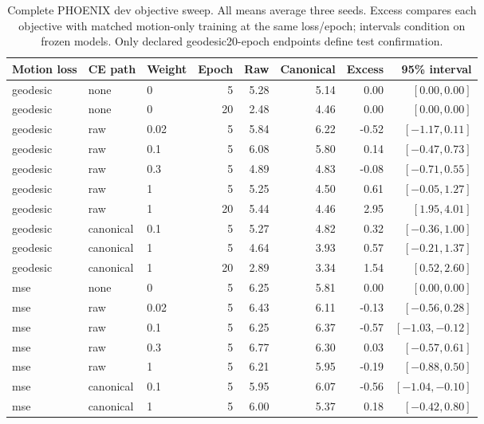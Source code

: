 \begin{table}[t]
\centering\small
\caption{Complete PHOENIX dev objective sweep. All means average three seeds. Excess compares each objective with matched motion-only training at the same loss/epoch; intervals condition on frozen models. Only declared geodesic20-epoch endpoints define test confirmation.}
\label{tab:ordinarysweep}
\begin{tabular}{lllrrrrr}\toprule
Motion loss&CE path&Weight&Epoch&Raw&Canonical&Excess&95\% interval\\\midrule
geodesic&none&0&5&5.28&5.14&0.00&$[0.00,0.00]$\\
geodesic&none&0&20&2.48&4.46&0.00&$[0.00,0.00]$\\
geodesic&raw&0.02&5&5.84&6.22&-0.52&$[-1.17,0.11]$\\
geodesic&raw&0.1&5&6.08&5.80&0.14&$[-0.47,0.73]$\\
geodesic&raw&0.3&5&4.89&4.83&-0.08&$[-0.71,0.55]$\\
geodesic&raw&1&5&5.25&4.50&0.61&$[-0.05,1.27]$\\
geodesic&raw&1&20&5.44&4.46&2.95&$[1.95,4.01]$\\
geodesic&canonical&0.1&5&5.27&4.82&0.32&$[-0.36,1.00]$\\
geodesic&canonical&1&5&4.64&3.93&0.57&$[-0.21,1.37]$\\
geodesic&canonical&1&20&2.89&3.34&1.54&$[0.52,2.60]$\\
mse&none&0&5&6.25&5.81&0.00&$[0.00,0.00]$\\
mse&raw&0.02&5&6.43&6.11&-0.13&$[-0.56,0.28]$\\
mse&raw&0.1&5&6.25&6.37&-0.57&$[-1.03,-0.12]$\\
mse&raw&0.3&5&6.77&6.30&0.03&$[-0.57,0.61]$\\
mse&raw&1&5&6.21&5.95&-0.19&$[-0.88,0.50]$\\
mse&canonical&0.1&5&5.95&6.07&-0.56&$[-1.04,-0.10]$\\
mse&canonical&1&5&6.00&5.37&0.18&$[-0.42,0.80]$\\
\bottomrule\end{tabular}\end{table}
